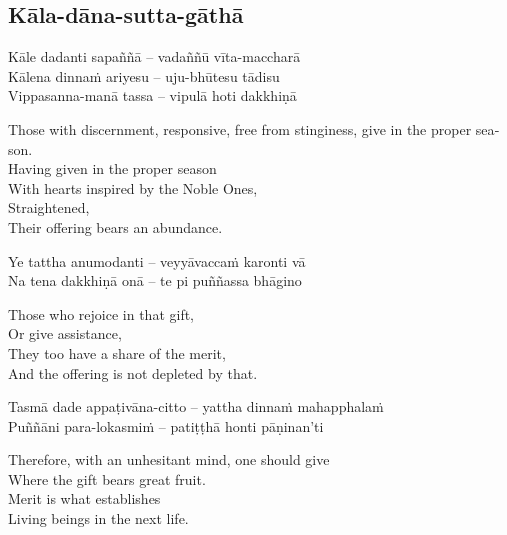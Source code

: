 \suttaRef{[AN 5.32]}

\subsection{Kāla-dāna-sutta-gāthā}
\label{kala-dana-sutta-gatha}

\begin{twochants}
  Kāle dadanti sapaññā – vadaññū vīta-maccharā\\
  Kālena dinnaṁ ariyesu – uju-bhūtesu tādisu\\
  Vippasanna-manā tassa – vipulā hoti dakkhiṇā
\end{twochants}

\begin{english}
  Those with discernment, responsive, free from stinginess, give in the proper season.\\
  Having given in the proper season\\
  With hearts inspired by the Noble Ones,\\
  Straightened,\\
  Their offering bears an abundance.
\end{english}

\begin{twochants}
  Ye tattha anumodanti – veyyāvaccaṁ karonti vā\\
  Na tena dakkhiṇā onā – te pi puññassa bhāgino
\end{twochants}

\begin{english}
  Those who rejoice in that gift,\\
  Or give assistance,\\
  They too have a share of the merit,\\
  And the offering is not depleted by that.
\end{english}

\begin{twochants}
  Tasmā dade appaṭivāna-citto – yattha dinnaṁ mahapphalaṁ\\
  Puññāni para-lokasmiṁ – patiṭṭhā honti pāṇinan'ti
\end{twochants}

\begin{english}
  Therefore, with an unhesitant mind, one should give\\
  Where the gift bears great fruit.\\
  Merit is what establishes\\
  Living beings in the next life.
\end{english}

